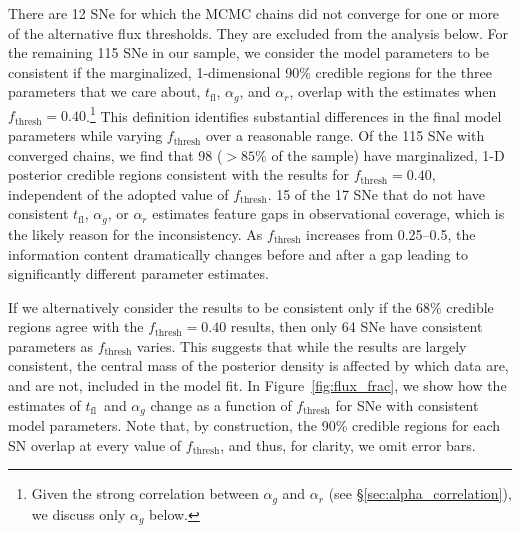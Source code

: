 \documentclass[twocolumn]{./aastex63}
\newcommand{\tfl}{$t_\mathrm{fl}$}
\begin{document}
There are 12 SNe for which the MCMC chains did not converge for one or more of
the alternative flux thresholds. They are excluded from the analysis below.
For the remaining 115 SNe in our sample, we consider the model parameters to
be consistent if the marginalized, 1-dimensional 90\% credible regions for the
three parameters that we care about, \tfl, $\alpha_g$, and $\alpha_r$, overlap
with the estimates when $f_\mathrm{thresh} = 0.40$.\footnote{Given the strong
correlation between $\alpha_g$ and $\alpha_r$ (see
\S\ref{sec:alpha_correlation}), we discuss only $\alpha_g$ below.} This
definition identifies substantial differences in the final model parameters
while varying $f_\mathrm{thresh}$ over a reasonable range. Of the 115 SNe with
converged chains, we find that 98 ($> 85\%$ of the sample) have marginalized,
1-D posterior credible regions consistent with the results for
$f_\mathrm{thresh} = 0.40$, independent of the adopted value of
$f_\mathrm{thresh}$. 15 of the 17 SNe that do not have consistent \tfl,
$\alpha_g$, or $\alpha_r$ estimates feature gaps in observational coverage,
which is the likely reason for the inconsistency. As $f_\mathrm{thresh}$
increases from 0.25--0.5, the information content dramatically changes before
and after a gap leading to significantly different parameter estimates.

If we alternatively consider the results to be consistent only if the 68\%
credible regions agree with the $f_\mathrm{thresh} = 0.40$ results, then only
64 SNe have consistent parameters as $f_\mathrm{thresh}$ varies. This suggests
that while the results are largely consistent, the central mass of the
posterior density is affected by which data are, and are not, included in the
model fit. In Figure~\ref{fig:flux_frac}, we show how the estimates of \tfl\
and $\alpha_g$ change as a function of $f_\mathrm{thresh}$ for SNe with
consistent model parameters. Note that, by construction, the 90\% credible
regions for each SN overlap at every value of $f_\mathrm{thresh}$, and thus,
for clarity, we omit error bars.
\end{document}

